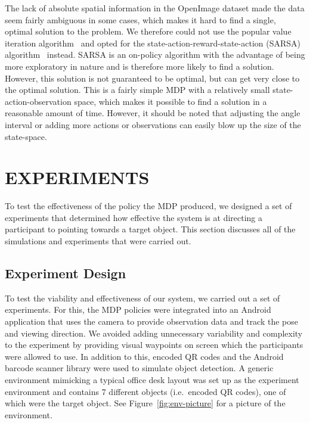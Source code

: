 \documentclass[a4paper, twoside]{article}
\begin{document}
The lack of absolute spatial information in the OpenImage dataset made the data seem fairly ambiguous in some cases, which makes it hard to find a single, optimal solution to the problem. We therefore could not use the popular value iteration algorithm~\cite{bellman1957markovian} and opted for the state-action-reward-state-action (SARSA) algorithm~\cite{rummery1994line} instead. SARSA is an on-policy algorithm with the advantage of being more exploratory in nature and is therefore more likely to find a solution. However, this solution is not guaranteed to be optimal, but can get very close to the optimal solution. This is a fairly simple MDP with a relatively small state-action-observation space, which makes it possible to find a solution in a reasonable amount of time. However, it should be noted that adjusting the angle interval or adding more actions or observations can easily blow up the size of the state-space. 

\section{\uppercase{Experiments}}

\noindent To test the effectiveness of the policy the MDP produced, we designed a set of experiments that determined how effective the system is at directing a participant to pointing towards a target object. This section discusses all of the simulations and experiments that were carried out. 

\subsection{Experiment Design}

\noindent To test the viability and effectiveness of our system, we carried out a set of experiments. For this, the MDP policies were integrated into an Android application that uses the camera to provide observation data and track the pose and viewing direction. We avoided adding unnecessary variability and complexity to the experiment by providing visual waypoints on screen which the participants were allowed to use. In addition to this, encoded QR codes and the Android barcode scanner library were used to simulate object detection. A generic environment mimicking a typical office desk layout was set up as the experiment environment and contains 7 different objects (i.e.\ encoded QR codes), one of which were the target object. See Figure~\ref{fig:env-picture} for a picture of the environment. 
\end{document}
